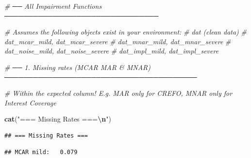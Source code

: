 \documentclass[
]{article}
\newenvironment{Shaded}{\begin{snugshade}}{\end{snugshade}}
\newcommand{\CommentTok}[1]{\textcolor[rgb]{0.56,0.35,0.01}{\textit{#1}}}
\newcommand{\DecValTok}[1]{\textcolor[rgb]{0.00,0.00,0.81}{#1}}
\newcommand{\FunctionTok}[1]{\textcolor[rgb]{0.13,0.29,0.53}{\textbf{#1}}}
\newcommand{\NormalTok}[1]{#1}
\newcommand{\SpecialCharTok}[1]{\textcolor[rgb]{0.81,0.36,0.00}{\textbf{#1}}}
\newcommand{\StringTok}[1]{\textcolor[rgb]{0.31,0.60,0.02}{#1}}
\begin{document}
\begin{Shaded}
\begin{Highlighting}[]
\CommentTok{\# ── All Impairment Functions ────────────────────────────────}

\CommentTok{\# Assumes the following objects exist in your environment:}
\CommentTok{\# dat                                        (clean data)}
\CommentTok{\# dat\_mcar\_mild,    dat\_mcar\_severe}
\CommentTok{\# dat\_mnar\_mild,    dat\_mnar\_severe}
\CommentTok{\# dat\_noise\_mild,   dat\_noise\_severe}
\CommentTok{\# dat\_impl\_mild,    dat\_impl\_severe}


\CommentTok{\# ── 1. Missing rates (MCAR MAR \& MNAR) ────────────────────────────────────────}

\CommentTok{\# Within the expected column! E.g. MAR only for CREFO, MNAR only for Interest Coverage}

\FunctionTok{cat}\NormalTok{(}\StringTok{"=== Missing Rates ===}\SpecialCharTok{\textbackslash{}n}\StringTok{"}\NormalTok{)}
\end{Highlighting}
\end{Shaded}

\begin{verbatim}
## === Missing Rates ===
\end{verbatim}

\begin{Shaded}
\end{Shaded}

\begin{verbatim}
## MCAR mild:   0.079
\end{verbatim}

\begin{Shaded}
\end{Shaded}
\end{document}
